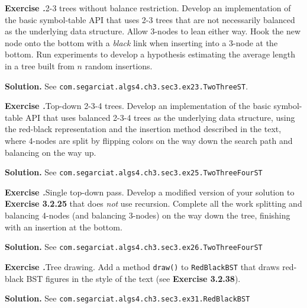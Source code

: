 \documentclass[12pt, a4paper]{article}
\newenvironment{ex}[2][Exercise]
{\par\medskip\noindent \textbf{#1 #2.}}
{\medskip}
\newenvironment{sol}[1][Solution]
{\par\medskip\noindent \textbf{#1.} }
{\medskip}
\begin{document}
	\begin{ex}{23}
		\emph{2-3 trees without balance restriction}. Develop an implementation of the basic
		symbol-table API that uses 2-3 trees that are not necessarily balanced as the underlying
		data structure. Allow 3-nodes to lean either way. Hook the new node onto the bottom
		with a \emph{black} link when inserting into a 3-node at the bottom. Run experiments
		to develop a hypothesis estimating the average length in a tree built from $n$ random
		insertions.
	\end{ex}
	\begin{sol}
		See \texttt{com.segarciat.algs4.ch3.sec3.ex23.TwoThreeST}.
	\end{sol}
	\begin{ex}{25}
		\emph{Top-down 2-3-4 trees}. Develop an implementation of the basic symbol-table API
		that uses balanced 2-3-4 trees as the underlying data structure, using the red-black
		representation and the insertion method described in the text, where 4-nodes are split
		by flipping colors on the way down the search path and balancing on the way up.
	\end{ex}
	\begin{sol}
		See \texttt{com.segarciat.algs4.ch3.sec3.ex25.TwoThreeFourST}
	\end{sol}
	\begin{ex}{26}
		\emph{Single top-down pass}. Develop a modified version of your solution to
		\textbf{Exercise 3.2.25} that does \emph{not} use recursion. Complete all the work
		splitting and balancing 4-nodes (and balancing 3-nodes) on the way down the tree,
		finishing with an insertion at the bottom.
	\end{ex}
	\begin{sol}
		See \texttt{com.segarciat.algs4.ch3.sec3.ex26.TwoThreeFourST}
	\end{sol}
	\begin{ex}{31}
		\emph{Tree drawing}. Add a method \texttt{draw()} to \texttt{RedBlackBST} that
		draws red-black BST figures in the style of the text (see \textbf{Exercise 3.2.38}).
	\end{ex}
	\begin{sol}
		See \texttt{com.segarciat.algs4.ch3.sec3.ex31.RedBlackBST}
	\end{sol}
	
	\pagebreak
	\printbibliography
\end{document}
